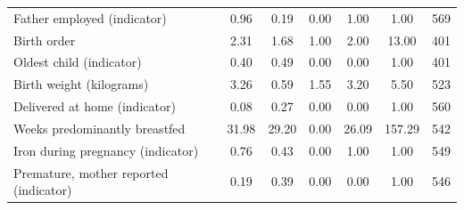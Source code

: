 \documentclass[12pt]{article}
\begin{document}
\begin{longtable}{l*{6}{c}}
Father employed (indicator)&        0.96&        0.19&        0.00&        1.00&        1.00&         569\\
Birth order         &        2.31&        1.68&        1.00&        2.00&       13.00&         401\\
Oldest child (indicator)&        0.40&        0.49&        0.00&        0.00&        1.00&         401\\
Birth weight (kilograms)&        3.26&        0.59&        1.55&        3.20&        5.50&         523\\
Delivered at home (indicator)&        0.08&        0.27&        0.00&        0.00&        1.00&         560\\
Weeks predominantly breastfed&       31.98&       29.20&        0.00&       26.09&      157.29&         542\\
Iron during pregnancy (indicator)&        0.76&        0.43&        0.00&        1.00&        1.00&         549\\
Premature, mother reported (indicator)&        0.19&        0.39&        0.00&        0.00&        1.00&         546\\


\end{longtable}
\end{document}
